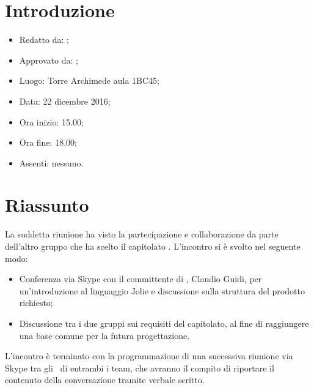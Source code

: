 \section{Introduzione}

	\begin{itemize}
		\item Redatto da: \DS;
		\item Approvato da: \NS;
		\item Luogo: Torre Archimede aula 1BC45;
		\item Data: 22 dicembre 2016;
		\item Ora inizio: 15.00;
		\item Ora fine: 18.00;
		\item Assenti: nessuno.
	\end{itemize}

\section{Riassunto}
La suddetta riunione ha visto la partecipazione e collaborazione da parte dell'altro gruppo che ha scelto il capitolato \progetto. L'incontro si è svolto nel seguente modo:
\begin{itemize}
	\item Conferenza via Skype con il committente di \proponente, Claudio Guidi, per un'introduzione al linguaggio Jolie e discussione sulla struttura del prodotto richiesto;
	\item Discussione tra i due gruppi sui requisiti del capitolato, al fine di raggiungere una base comune per la futura progettazione.
\end{itemize}
L'incontro è terminato con la programmazione di una successiva riunione via Skype tra gli \Anas\ di entrambi i team, che avranno il compito di riportare il contenuto della conversazione tramite verbale scritto.